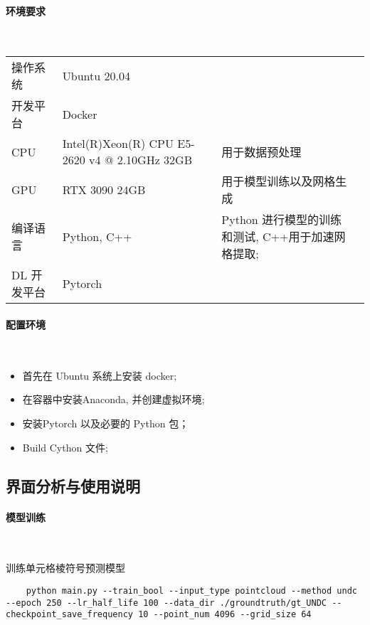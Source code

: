 \paragraph{环境要求}~{}

\begin{table}[h]
    \centering
    \begin{tabularx}{\textwidth}{X X X X}
		操作系统 	& Ubuntu 20.04 	& \\
		开发平台 	& Docker			& \\
		CPU 		& Intel(R)Xeon(R) CPU E5-2620 v4 @ 2.10GHz 32GB & 用于数据预处理 \\
		GPU 		& RTX 3090 24GB		& 用于模型训练以及网格生成 \\
		编译语言 	& Python, C++ 		& Python 进行模型的训练和测试, C++用于加速网格提取; \\
		DL 开发平台 & Pytorch 		& \\
    \end{tabularx}
\end{table}


\paragraph{配置环境}~{}

\begin{itemize}
	\item 首先在 Ubuntu 系统上安装 docker;
	\item 在容器中安装Anaconda, 并创建虚拟环境;
	\item 安装Pytorch 以及必要的 Python 包；
	\item Build Cython 文件;
\end{itemize}

\subsection{界面分析与使用说明}

\paragraph{模型训练}~{}

训练单元格棱符号预测模型

\lstset{language=bash}
\begin{lstlisting}
    python main.py --train_bool --input_type pointcloud --method undc --epoch 250 --lr_half_life 100 --data_dir ./groundtruth/gt_UNDC --checkpoint_save_frequency 10 --point_num 4096 --grid_size 64 
\end{lstlisting}


